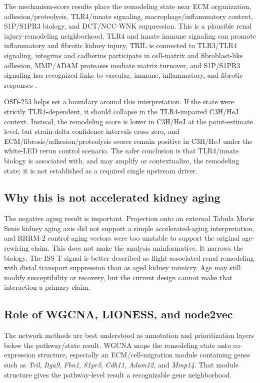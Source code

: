 \documentclass[11pt]{article}
\newcommand{\gene}[1]{\textit{#1}}
\begin{document}
The mechanism-score results place the remodeling state near ECM organization, adhesion/proteolysis, TLR4/innate signaling, macrophage/inflammatory context, S1P/S1PR3 biology, and DCT/NCC-WNK suppression. This is a plausible renal injury-remodeling neighborhood. TLR4 and innate immune signaling can promote inflammatory and fibrotic kidney injury, TRIL is connected to TLR3/TLR4 signaling, integrins and cadherins participate in cell-matrix and fibroblast-like adhesion, MMP/ADAM proteases mediate matrix turnover, and S1P/S1PR3 signaling has recognized links to vascular, immune, inflammatory, and fibrotic responses \citep{souza2015tlr4,carpenter2009tril,carpenter2011tril,wochal2014tril,s1p2017,s1p2020,s1p2009}.

OSD-253 helps set a boundary around this interpretation. If the state were strictly TLR4-dependent, it should collapse in the TLR4-impaired C3H/HeJ context. Instead, the remodeling score is lower in C3H/HeJ at the point-estimate level, but strain-delta confidence intervals cross zero, and ECM/fibrosis/adhesion/proteolysis scores remain positive in C3H/HeJ under the white-LED rerun control scenario. The safer conclusion is that TLR4/innate biology is associated with, and may amplify or contextualize, the remodeling state; it is not established as a required single upstream driver.

\subsection{Why this is not accelerated kidney aging}

The negative aging result is important. Projection onto an external Tabula Muris Senis kidney aging axis did not support a simple accelerated-aging interpretation, and RRRM-2 control-aging vectors were too unstable to support the original age-rewiring claim. This does not make the analysis uninformative. It narrows the biology. The ISS-T signal is better described as flight-associated renal remodeling with distal transport suppression than as aged kidney mimicry. Age may still modify susceptibility or recovery, but the current design cannot make that interaction a primary claim.

\subsection{Role of WGCNA, LIONESS, and node2vec}

The network methods are best understood as annotation and prioritization layers below the pathway/state result. WGCNA maps the remodeling state onto co-expression structure, especially an ECM/cell-migration module containing genes such as \gene{Tril}, \gene{Itga9}, \gene{Fbn1}, \gene{S1pr3}, \gene{Cdh11}, \gene{Adam12}, and \gene{Mmp14}. That module structure gives the pathway-level result a recognizable gene neighborhood.
\end{document}
